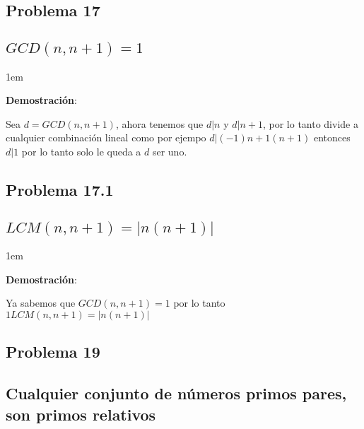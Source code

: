 \documentclass[12pt, fleqn]{article}                             %
\newenvironment{SmallIndentation}[1][0.75em]                    %
    {\begin{adjustwidth}{#1}{}\begin{footnotesize}}                 %
    {\end{footnotesize}\end{adjustwidth}}                           %
\begin{document}
    \subsection{Problema 17}
    \subsection*{$GCD(n, n+1) = 1$}

        \begin{SmallIndentation}[1em]
            \textbf{Demostración}:

            Sea $d = GCD(n, n+1)$, ahora tenemos que $d|n$ y $d|n+1$, por lo tanto
            divide a cualquier combinación lineal como por ejempo $d|(-1)n +1(n+1)$
            entonces $d|1$ por lo tanto solo le queda a $d$ ser uno.
        \end{SmallIndentation}

    \subsection{Problema 17.1}
    \subsection*{$LCM(n, n+1) = |n(n+1)|$}

        \begin{SmallIndentation}[1em]
            \textbf{Demostración}:

            Ya sabemos que $GCD(n, n+1) = 1$ por lo tanto 
            $1 LCM(n, n+1) = |n(n+1)|$
        \end{SmallIndentation}


    \clearpage
    \subsection{Problema 19}
    \subsection*{Cualquier conjunto de números primos pares, son primos relativos}
\end{document}
